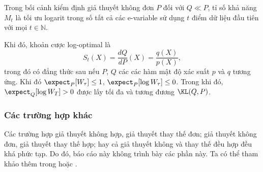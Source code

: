 Trong bối cảnh kiểm định giả thuyết không đơn $P$ đối với $Q \ll P$, tỉ số
khả năng $M_t$ là tối ưu logarit trong số tất cả các e-variable sử dụng $t$
điểm dữ liệu đầu tiên với mọi $t \in \mathbb{N}$.

Khi đó, khoản cược log-optimal là \begin{equation}
  S_t(X) = \frac{dQ}{dP}(X) = \frac{q(X)}{p(X)},
\end{equation} trong đó có đẳng thức sau nếu $P$, $Q$ các các hàm mật độ xác
suất $p$ và $q$ tương ứng. Khi đó $\expect_P[W_\tau] \le 1$, $\expect_P[\log
W_\tau] \le 0$. Trong khi đó, $\expect_Q[\log W_T] > 0$ được lấy tối đa và
tương đương $\KL(Q, P)$.

\subsubsection{Các trường hợp khác}

Các trường hợp giả thuyết không hợp, giả thuyết thay thế đơn; giả thuyết
không đơn, giả thuyết thay thế hợp; hay cả giả thuyết không và thay thế đều hợp
đều khá phức tạp. Do đó, báo cáo này không trình bày các phần này. Ta có thể
tham khảo thêm trong \cite{ramdas2023savi}
hoặc \cite{ramdas2025ebook}.

